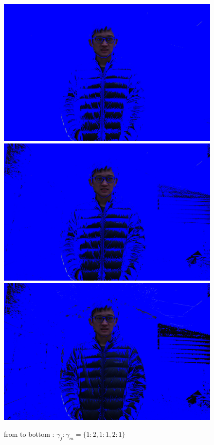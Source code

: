\documentclass[final]{cvpr}
\begin{document}
\begin{figure}[ht]
   \centering
   \includegraphics[scale=0.03]{../data/output/arthas_final_nf_1.2_0.10_7_14.JPG}
   \includegraphics[scale=0.03]{../data/output/arthas_final_nf_1.2_0.10_10_10.JPG}
   \includegraphics[scale=0.03]{../data/output/arthas_final_nf_1.2_0.10_14_7.JPG}
   \caption{from to bottom : $ \gamma_f : \gamma_m = \{1:2,1:1,2:1\}$}
\end{figure}
\end{document}
